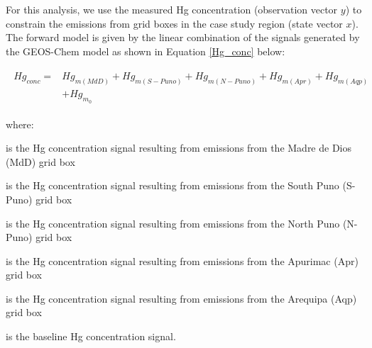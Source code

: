 \begin{flushleft}
For this analysis, we use the measured Hg concentration (observation vector $y$) to constrain the  emissions from grid boxes in the case study region (state vector $x$). The forward model is given by the linear combination of the signals generated by the GEOS-Chem model as shown in Equation \ref{Hg_conc} below:

\begin{align}
\begin{split}\label{Hg_conc}
Hg_{conc}= {}&Hg_{m(MdD)}+ Hg_{m(S-Puno)} + Hg_{m(N-Puno)} + Hg_{m(Apr)}+ Hg_{m(Aqp)}\\
            & +Hg_{m_0}
\end{split}
\end{align}

where:
\end{flushleft}

\begin{description}[leftmargin=!,labelwidth={5 em}]
    \item [$Hg_{m(MdD)}$] is the Hg concentration signal resulting from emissions from the Madre de Dios (MdD) grid box
    \item [$Hg_{m(S-Puno)}$] is the Hg concentration signal resulting from emissions from the South Puno (S-Puno) grid box
    \item [$Hg_{m(N-Puno)}$] is the Hg concentration signal resulting from emissions from the North Puno (N-Puno) grid box
    \item [$Hg_{m(Apr)}$] is the Hg concentration signal resulting from emissions from the Apurimac (Apr) grid box
    \item [$Hg_{m(Aqp)}$] is the Hg concentration signal resulting from emissions from the Arequipa (Aqp) grid box
    \item [$Hg_{m_0}$] is the baseline Hg concentration signal.
\end{description}

